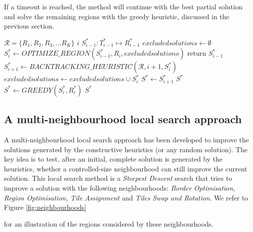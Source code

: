 \documentclass[preprint,12pt]{elsarticle}
\begin{document}
{If a timeout is reached, the method will continue with the best partial solution and solve the remaining regions with the greedy heuristic, discussed in the previous section.
%

\begin{algorithm}
\small
\caption{$BACKTRACKING\_HEURISTIC$}
\begin{algorithmic}
\Require $\mathcal{R} = \{R_1,R_2,R_3, \ldots R_K\}$ 
\Require $i$ 
\Require $S^\ast_{i-1}: T^\ast_{i-1}\mapsto R^\ast_{i-1}$ 
\State
\State $excluded solutions \gets \emptyset$ 
\State $S^\ast_{i} \gets OPTIMIZE\_REGION(S^\ast_{i-1},R_{i},excludedsolutions)$
\State return $S^\ast_{i-1}$ 
\Else
\State $S^\ast_{i+1} \gets BACKTRACKING\_HEURISTIC(\mathcal{R},i+1,S^\ast_{i})$
 
\State $excluded solutions \gets excluded solutions \cup S_i^\ast$
\Else
\State $S^\ast \gets S^\ast_{i+1}$ 
\State \Return $S^\ast$
\EndIf
\EndIf
\EndWhile
\State $S^\ast \gets GREEDY(S^\ast_i,R^\ast_i)$
\State \Return $S^\ast$
\end{algorithmic}
\label{alg:backtracking}
\end{algorithm}

\subsection{A multi-neighbourhood local search approach}
\label{subsec:VNSILS}

\noindent
A multi-neighbourhood local search approach has been developed to improve the solutions generated by the constructive heuristics (or any random solution).
The key idea is to test, after an initial, complete solution is generated by the heuristics, whether a controlled-size neighbourhood can still improve the current solution.
This local search method is a \textit{Steepest Descent} search that tries to improve a solution with the following neighbourhoods: \emph{Border Optimisation, Region Optimisation, Tile Assignment} and \emph{Tiles Swap and Rotation}.
We refer to Figure \ref{fig:neighbourhoods}} for an illustration of the regions considered by these neighbourhoods.
\end{document}
